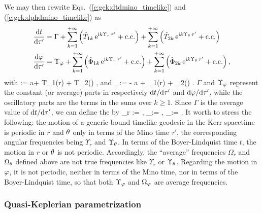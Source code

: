 We may then rewrite Eqs.~(\ref{e:gek:dtdmino_timelike}) and (\ref{e:gek:dphdmino_timelike})
as
\begin{subequations}
\begin{align}
 & \frac{\mathrm{d} t}{\mathrm{d} \tau'} = \Gamma + \sum_{k=1}^{+\infty} \left( \hat{T}_{1k} \, \mathrm{e}^{\mathrm{i} k \Upsilon_r \, \tau'} + \mathrm{c.c.} \right)
    + \sum_{k=1}^{+\infty} \left( \hat{T}_{2k} \, \mathrm{e}^{\mathrm{i} k \Upsilon_\theta \, \tau'} + \mathrm{c.c.} \right) \\
 & \frac{\mathrm{d} \varphi}{\mathrm{d} \tau'} = \Upsilon_\varphi + \sum_{k=1}^{+\infty} \left( \hat{\Phi}_{1k} \, \mathrm{e}^{\mathrm{i} k \Upsilon_r \, \tau'} + \mathrm{c.c.} \right)
 + \sum_{k=1}^{+\infty} \left( \hat{\Phi}_{2k} \, \mathrm{e}^{\mathrm{i} k \Upsilon_\theta \, \tau'} + \mathrm{c.c.} \right) ,
\end{align}
\end{subequations}
with
\be
    \Gamma := a\ell + \langle T_1(r) \rangle + \langle T_2(\th) \rangle ,
\ee
and
\be
    \Upsilon_\ph :=  - a \veps + \langle \Phi_1(r) \rangle + \langle \Phi_2(\th) \rangle .
\ee
$\Gamma$ and $\Upsilon_\varphi$ represent the constant (or average) parts in
respectively $\mathrm{d} t/\mathrm{d}\tau'$ and $\mathrm{d} \varphi / \mathrm{d}\tau'$, while the oscillatory parts
are the terms in the sums over $k\geq 1$.
Since $\Gamma$ is the average value of $\mathrm{d} t/\mathrm{d}\tau'$,
we can define the
by \cite{DrascH04,FujitH09}
\be
    \Omega_r := ,\qquad
    \Omega_\th := \frac{\Upsilon_\th}{\Gamma}, \qquad
    \Omega_\ph := \frac{\Upsilon_\ph}{\Gamma} .
\ee
It worth to stress the following: the motion of a generic bound timelike
geodesic in the Kerr spacetime is periodic in $r$ and $\theta$
only in terms of the Mino time $\tau'$, the corresponding angular frequencies
being $\Upsilon_r$ and $\Upsilon_\theta$. In terms of the Boyer-Lindquist time
$t$, the motion in $r$ or $\theta$ is not periodic. Accordingly, the ``average''
frequencies $\Omega_r$ and $\Omega_\theta$ defined above are not true
frequencies like $\Upsilon_r$ or $\Upsilon_\theta$.
Regarding the motion in $\varphi$,
it is not periodic, neither in terms of the Mino time, nor in terms
of the Boyer-Lindquist time, so that both $\Upsilon_\varphi$ and $\Omega_\varphi$
are average frequencies.

\subsubsection{Quasi-Keplerian parametrization}

